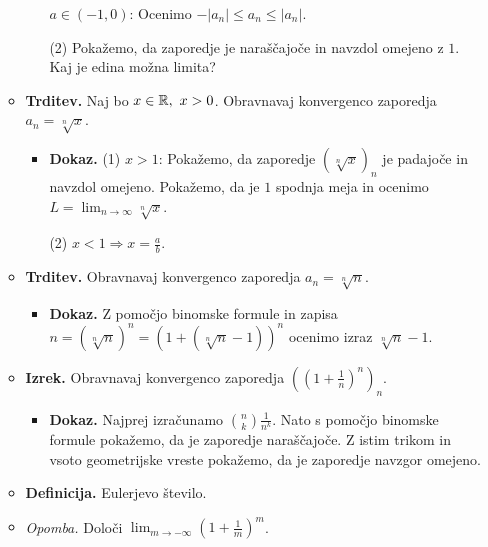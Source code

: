 \begin{enumerate}
\begin{itemize}
\begin{itemize}
            $a \in (-1, 0)$: Ocenimo $-|a_n| \leq a_n \leq |a_n|$.

            (2) Pokažemo, da zaporedje je naraščajoče in navzdol omejeno z $1$. Kaj je edina možna limita?
        \end{itemize} 
        \item \colorbox{blue!30}{\textbf{Trditev.}}  Naj bo $x \in \mathbb{R}, \ x>0$. Obravnavaj konvergenco zaporedja $a_n = \sqrt[n]{x}$.
        \begin{itemize}
            \item \colorbox{green!30}{\textbf{Dokaz.}} (1) $x>1$: Pokažemo, da zaporedje $(\sqrt[n]{x})_n$ je padajoče in navzdol omejeno. Pokažemo, da je $1$ spodnja meja in ocenimo $L = \lim_{n \to \infty} \sqrt[n]{x}$.
            
            (2) $x<1 \Rightarrow x = \frac{a}{b}$.
        \end{itemize} 
        \item \colorbox{blue!30}{\textbf{Trditev.}}  Obravnavaj konvergenco zaporedja $a_n = \sqrt[n]{n}$.
        \begin{itemize}
            \item \colorbox{green!30}{\textbf{Dokaz.}} Z pomočjo binomske formule in zapisa $n = (\sqrt[n]{n})^n = (1 + (\sqrt[n]{n} - 1))^n$ ocenimo izraz $\sqrt[n]{n} - 1$. 
        \end{itemize} 
        \item \colorbox{blue!30}{\textbf{Izrek.}} Obravnavaj konvergenco zaporedja $\left( \left( 1 + \frac{1}{n}\right)^n \right)_n$.
        \begin{itemize}
            \item \colorbox{green!30}{\textbf{Dokaz.}} Najprej izračunamo $\binom{n}{k} \frac{1}{n^k}$. Nato s pomočjo binomske formule pokažemo, da je zaporedje naraščajoče. Z istim trikom in vsoto geometrijske vreste pokažemo, da je zaporedje navzgor omejeno.
        \end{itemize} 
        \item \colorbox{purple!30}{\textbf{Definicija.}} Eulerjevo število.
        \item \colorbox{yellow!30}{\emph{Opomba.}} Določi $\displaystyle \lim_{m \to -\infty} \left( 1 + \frac{1}{m}\right)^m$.
    \end{itemize}


\end{enumerate}
